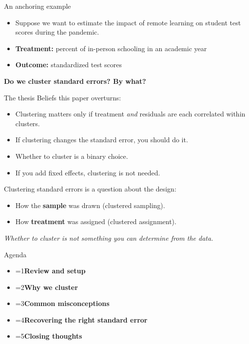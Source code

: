 \documentclass[11pt,aspectratio=169]{beamer}
\newcommand{\bx}[1]{\textbf{#1}}
\newcounter{agcur}
\newcommand{\agitem}[2]{\item {\ifnum\value{agcur}=#1\bfseries\fi #2}}
\newcommand{\agenda}[1]{%
  \setcounter{agcur}{#1}%
  \begin{frame}{Agenda}
    \vspace{0.6em}
    \large
    \begin{itemize}\setlength{\itemsep}{11pt}
      \agitem{1}{Review and setup}
      \agitem{2}{Why we cluster}
      \agitem{3}{Common misconceptions}
      \agitem{4}{Recovering the right standard error}
      \agitem{5}{Closing thoughts}
    \end{itemize}
  \end{frame}}
\begin{document}
\begin{frame}{An anchoring example}
\begin{itemize}\setlength{\itemsep}{8pt}
  \item Suppose we want to estimate the impact of remote learning on student test scores during the pandemic.
  \item \bx{Treatment:} percent of in-person schooling in an academic year
  \item \bx{Outcome:} standardized test scores
\end{itemize}
\vfill
\begin{center}
  \large\bfseries Do we cluster standard errors? By what?
\end{center}
\end{frame}

\begin{frame}{The thesis}
Beliefs this paper overturns:
\begin{itemize}\setlength{\itemsep}{4pt}
  \item Clustering matters only if treatment \emph{and} residuals are each correlated
        within clusters.
  \item If clustering changes the standard error, you should do it.
  \item Whether to cluster is a binary choice.
  \item If you add fixed effects, clustering is not needed.
\end{itemize}
\vspace{8pt}
Clustering standard errors is a question about the design:
\begin{itemize}\setlength{\itemsep}{4pt}
  \item How the \bx{sample} was drawn (clustered sampling).
  \item How \bx{treatment} was assigned (clustered assignment).
\end{itemize}
\vfill
\begin{center}
  \itshape Whether to cluster is not something you can determine from the data.
\end{center}
\end{frame}

\agenda{2}
\end{document}
